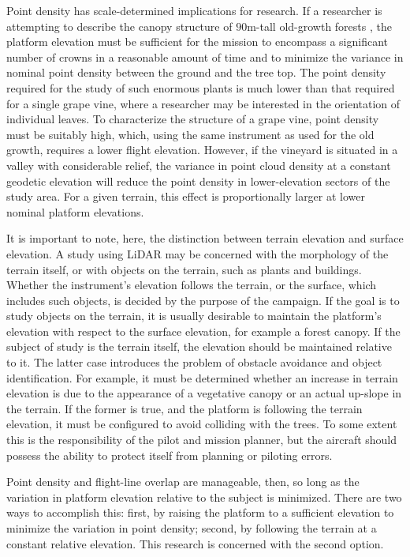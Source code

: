 \documentclass[10pt]{article}
\begin{document}
Point density has scale-determined implications for research. If a researcher is attempting to describe the canopy structure of $90\si{\m}$-tall old-growth forests \cite{Niemann2007,Niemann2012}, the platform elevation must be sufficient for the mission to encompass a significant number of crowns in a reasonable amount of time and to  minimize the variance in nominal point density between the ground and the tree top. The point density required for the study of such enormous plants is much lower than that required for a single grape vine, where a researcher may be interested in the orientation of individual leaves. To characterize the structure of a grape vine, point density must be suitably high, which, using the same instrument as used for the old growth, requires a lower flight elevation. However, if the vineyard is situated in a valley with considerable relief, the variance in point cloud density at a constant geodetic elevation will reduce the point density in lower-elevation sectors of the study area. For a given terrain, this effect is proportionally larger at lower nominal platform elevations.

It is important to note, here, the distinction between terrain elevation and surface elevation. A study using LiDAR may be concerned with the morphology of the terrain itself, or with objects on the terrain, such as plants and buildings. Whether the instrument's elevation follows the terrain, or the surface, which includes such objects, is decided by the purpose of the campaign. If the goal is to study objects on the terrain, it is usually desirable to maintain the platform's elevation with respect to the surface elevation, for example a forest canopy. If the subject of study is the terrain itself, the elevation should be maintained relative to it. The latter case introduces the problem of obstacle avoidance and object identification. For example, it must be determined whether an increase in terrain elevation is due to the appearance of a vegetative canopy or an actual up-slope in the terrain. If the former is true, and the platform is following the terrain elevation, it must be configured to avoid colliding with the trees. To some extent this is the responsibility of the pilot and mission planner, but the aircraft should possess the ability to protect itself from planning or piloting errors.

Point density and flight-line overlap are manageable, then, so long as the variation in platform elevation relative to the subject is minimized. There are two ways to accomplish this: first, by raising the platform to a sufficient elevation to minimize the variation in point density; second, by following the terrain at a constant relative elevation. This research is concerned with the second option.
\end{document}
